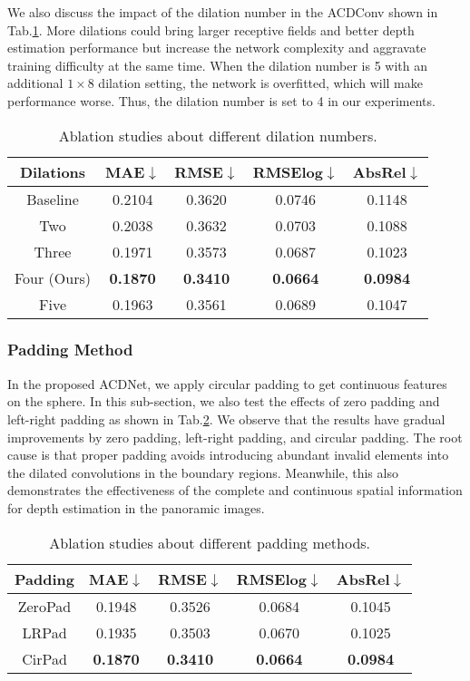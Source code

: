 \documentclass[letterpaper]{article} \usepackage{aaai21}  \usepackage{times}  \usepackage{helvet} \usepackage{courier}  \usepackage[hyphens]{url}  \usepackage{graphicx} \urlstyle{rm} \def\UrlFont{\rm}  \usepackage{natbib}  \usepackage{caption} \frenchspacing  \setlength{\pdfpagewidth}{8.5in}  \setlength{\pdfpageheight}{11in}
\newcommand{\newchange}[1]{{\color{black}#1}}
\begin{document}
We also discuss the impact of the dilation number in the ACDConv shown in Tab.\ref{tab:abs-4}. More dilations could bring larger receptive fields and better depth estimation performance but increase the network complexity and aggravate training difficulty at the same time. 
When the dilation number is 5 with an additional $1\times8$ dilation setting, the network is overfitted, which will make performance worse.
Thus, the dilation number is set to 4 in our experiments.

\begin{table}[tb]
    \centering
\begin{tabular}{ccccc} 
\toprule 
Dilations & MAE$\downarrow$ & RMSE$\downarrow$ & RMSElog$\downarrow$ &  AbsRel$\downarrow$ \\
\midrule 
Baseline  & 0.2104 & 0.3620 & 0.0746 & 0.1148 \\
Two & 0.2038 & 0.3632 & 0.0703 & 0.1088 \\ Three & 0.1971 & 0.3573 & 0.0687 & 0.1023 \\ Four (Ours)  & \textbf{0.1870} & \textbf{0.3410} & \textbf{0.0664} & \textbf{0.0984} \\
Five & 0.1963 & 0.3561 & 0.0689 & 0.1047 \\ 
\bottomrule
    \end{tabular}
    \caption{Ablation studies about different dilation numbers.}
    \label{tab:abs-4}
\end{table}

\subsubsection{Padding Method}

In the proposed ACDNet, we apply circular padding to get continuous features on the sphere. In this sub-section, we also test the effects of zero padding and left-right padding as shown in Tab.\ref{tab:abs-3}. We observe that the results have gradual improvements by zero padding, left-right padding, and circular padding. 
\newchange{
The root cause is that proper padding avoids introducing abundant invalid elements into the dilated convolutions in the boundary regions.
}
Meanwhile, this also demonstrates the effectiveness of the complete and continuous spatial information for depth estimation in the panoramic images.

\begin{table}[tb]
    \centering
    \begin{tabular}{ccccc} 
\toprule 
Padding & MAE$\downarrow$ & RMSE$\downarrow$ & RMSElog$\downarrow$ &  AbsRel$\downarrow$ \\
\midrule 
ZeroPad & 0.1948 & 0.3526 & 0.0684 & 0.1045 \\
LRPad & 0.1935 & 0.3503 & 0.0670 & 0.1025 \\
CirPad & \textbf{0.1870} & \textbf{0.3410} & \textbf{0.0664} & \textbf{0.0984} \\
\bottomrule
    \end{tabular}
    \caption{Ablation studies about different padding methods.}
    \label{tab:abs-3}
\end{table}
\end{document}
